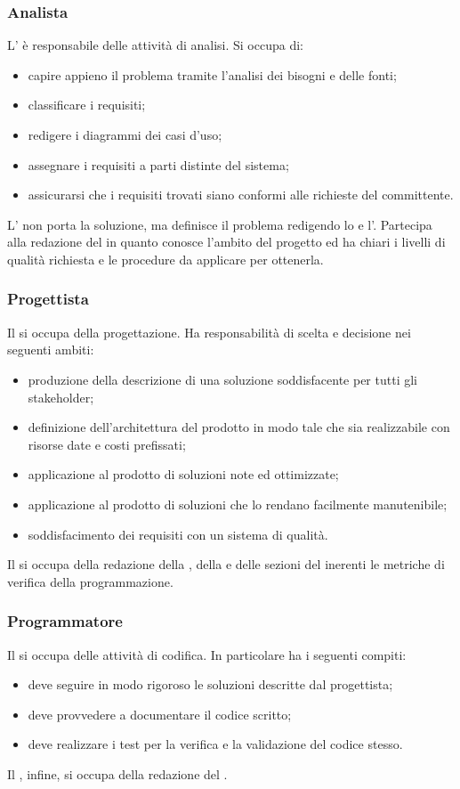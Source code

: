 		\subsubsection{Analista}
			L' è responsabile delle attività di analisi. Si occupa di:
			\begin{itemize}
				\item capire appieno il problema tramite l'analisi dei bisogni e delle fonti;
				\item classificare i requisiti;
				\item redigere i diagrammi dei casi d'uso;
				\item assegnare i requisiti a parti distinte del sistema;
				\item assicurarsi che i requisiti trovati siano conformi alle richieste del committente.
			\end{itemize}
			L' non porta la soluzione, ma definisce il problema redigendo lo  e l'. Partecipa alla redazione del  in quanto conosce l’ambito del progetto ed ha chiari i livelli di qualità richiesta e le procedure da applicare per ottenerla.
		\subsubsection{Progettista}
			Il  si occupa della progettazione. Ha responsabilità di scelta e decisione nei seguenti ambiti:
			\begin{itemize}
				\item produzione della descrizione di una soluzione soddisfacente per tutti gli stakeholder;
				\item definizione dell'architettura del prodotto in modo tale che sia realizzabile con risorse date e costi prefissati;
				\item applicazione al prodotto di soluzioni note ed ottimizzate;
				\item applicazione al prodotto di soluzioni che lo rendano facilmente manutenibile;
				\item soddisfacimento dei requisiti con un sistema di qualità.
			\end{itemize}
			Il  si occupa della redazione della , della  e delle sezioni del  inerenti le metriche di verifica della programmazione.
		\subsubsection{Programmatore}
			Il  si occupa delle attività di codifica. In particolare ha i seguenti compiti:
			\begin{itemize}
				\item deve seguire in modo rigoroso le soluzioni descritte dal progettista;
				\item deve provvedere a documentare il codice scritto;
				\item deve realizzare i test per la verifica e la validazione del codice stesso.
			\end{itemize}
			Il , infine, si occupa della redazione del .
